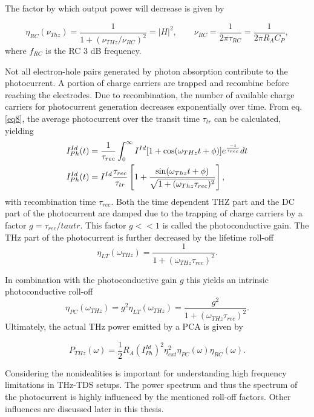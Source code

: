 The factor by which output power will decrease is given by 

\begin{equation}
    \eta_{RC}(\nu_{Thz}) = \frac{1}{1+ (\nu_{THz}/\nu_{RC})^2} = |H|^2,  \qquad  \nu_{RC} = \frac{1}{2\pi\tau_{RC}} = \frac{1}{2\pi R_A C_P},
\end{equation}
where $f_{RC}$ is the RC 3 dB frequency.

Not all electron-hole pairs generated by photon absorption contribute to the photocurrent. A portion of charge carriers are trapped and recombine before reaching the electrodes. Due to recombination, the number of available charge carriers for photocurrent generation decreases exponentially over time. From eq. \eqref{eq8}, the average photocurrent over the transit time $\tau_{tr}$ can be calculated, yielding
\begin{align}
	I_{Ph}^{Id}(t) &= \frac{1}{\tau_{rec}} \int_{0}^{\infty} I^{Id}[1 + \cos(\omega_{THz}t + \phi)]e^{\frac{-t}{\tau_{rec}}}dt \notag \\
	I_{Ph}^{Id}(t) &=  I^{Id}\frac{\tau_{rec}}{\tau_{tr}}\left[
		1 + \frac{\sin(\omega_{Thz}t + \phi)}{\sqrt{1 + (\omega_{Thz} \tau_{rec})^2}}
	\right],
\end{align}
with recombination time $\tau_{rec}$. Both the time dependent THZ part and the DC part of the photocurrent are damped due to the trapping of charge carriers by a factor $g = \tau_{rec} /tau{tr}$. This factor $g << 1$ is called the photoconductive gain. The THz part of the photocurrent is further decreased by the lifetime roll-off 
\begin{equation}
	\eta_{LT}(\omega_{THz}) = \frac{1}{1 + (\omega_{THz}\tau_{rec})^2}.
\end{equation}

In combination with the photoconductive gain $g$ this yields an intrinsic photoconductive roll-off
\begin{equation}
	\eta_{PC}(\omega_{THz}) = g^2\eta_{LT}(\omega_{THz}) = \frac{g^2}{1 + (\omega_{THz}\tau_{rec})^2}.
\end{equation}
Ultimately, the actual THz power emitted by a PCA is given by 

\begin{equation}
    P_{THz}(\omega) = \frac{1}{2}R_A(I_{Ph}^{Id})^2\eta_{ext}^2\eta_{PC}(\omega)\eta_{RC}(\omega).
    \label{eq_power}
\end{equation}

Considering the nonidealities is important for understanding high frequency limitations in THz-TDS setups. The power spectrum and thus the spectrum of the photocurrent is highly influenced by the mentioned roll-off factors. Other influences are discussed later in this thesis. 


